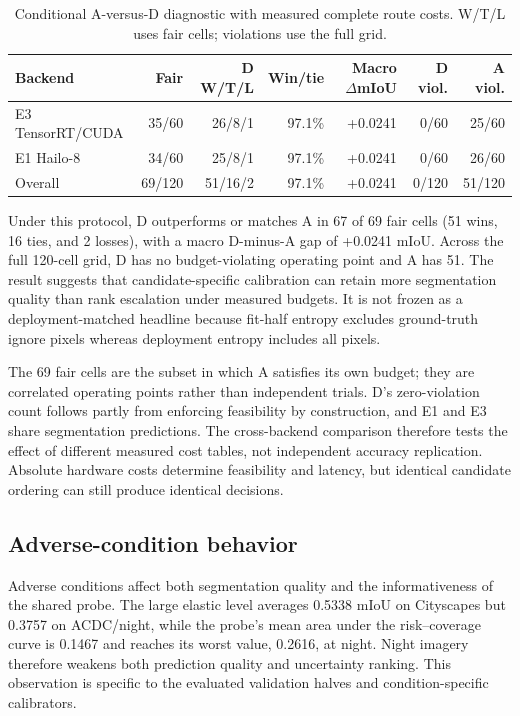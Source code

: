 \documentclass[a4paper,review,12pt]{elsarticle}
\newcommand{\miou}{mIoU}
\begin{document}
\begin{table}[t]
\centering
\caption{Conditional A-versus-D diagnostic with measured complete route costs. W/T/L uses fair cells; violations use the full grid.}
\label{tab:routerfinal}
\small
\begin{tabular}{@{}lrrrrrr@{}}
\toprule
Backend & Fair & D W/T/L & Win/tie & Macro $\Delta$\miou{} & D viol. & A viol. \\
\midrule
E3 TensorRT/CUDA & 35/60 & 26/8/1 & 97.1\% & +0.0241 & 0/60 & 25/60 \\
E1 Hailo-8 & 34/60 & 25/8/1 & 97.1\% & +0.0241 & 0/60 & 26/60 \\
Overall & 69/120 & 51/16/2 & 97.1\% & +0.0241 & 0/120 & 51/120 \\
\bottomrule
\end{tabular}
\end{table}

Under this protocol, D outperforms or matches A in 67 of 69 fair cells (51 wins, 16 ties, and 2 losses), with a macro D-minus-A gap of +0.0241 \miou{}. Across the full 120-cell grid, D has no budget-violating operating point and A has 51. The result suggests that candidate-specific calibration can retain more segmentation quality than rank escalation under measured budgets. It is not frozen as a deployment-matched headline because fit-half entropy excludes ground-truth ignore pixels whereas deployment entropy includes all pixels.

The 69 fair cells are the subset in which A satisfies its own budget; they are correlated operating points rather than independent trials. D's zero-violation count follows partly from enforcing feasibility by construction, and E1 and E3 share segmentation predictions. The cross-backend comparison therefore tests the effect of different measured cost tables, not independent accuracy replication. Absolute hardware costs determine feasibility and latency, but identical candidate ordering can still produce identical decisions.



\subsection{Adverse-condition behavior}

Adverse conditions affect both segmentation quality and the informativeness of the shared probe. The large elastic level averages 0.5338 \miou{} on Cityscapes but 0.3757 on ACDC/night, while the probe's mean area under the risk--coverage curve is 0.1467 and reaches its worst value, 0.2616, at night. Night imagery therefore weakens both prediction quality and uncertainty ranking. This observation is specific to the evaluated validation halves and condition-specific calibrators.
\end{document}
